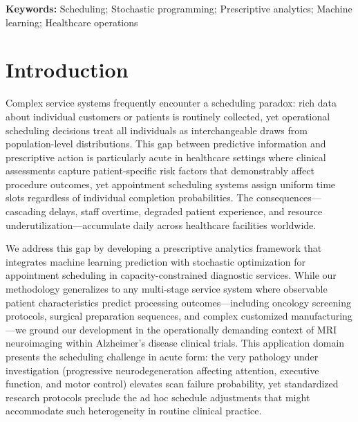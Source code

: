 \documentclass[11pt,a4paper]{article}
\begin{document}
\noindent\textbf{Keywords:} Scheduling; Stochastic programming; Prescriptive analytics; Machine learning; Healthcare operations



\newpage
\section{Introduction}


Complex service systems frequently encounter a scheduling paradox: rich data about individual customers or patients is routinely collected, yet operational scheduling decisions treat all individuals as interchangeable draws from population-level distributions. This gap between predictive information and prescriptive action is particularly acute in healthcare settings where clinical assessments capture patient-specific risk factors that demonstrably affect procedure outcomes, yet appointment scheduling systems assign uniform time slots regardless of individual completion probabilities. The consequences---cascading delays, staff overtime, degraded patient experience, and resource underutilization---accumulate daily across healthcare facilities worldwide.

We address this gap by developing a prescriptive analytics framework that integrates machine learning prediction with stochastic optimization for appointment scheduling in capacity-constrained diagnostic services. While our methodology generalizes to any multi-stage service system where observable patient characteristics predict processing outcomes---including oncology screening protocols, surgical preparation sequences, and complex customized manufacturing---we ground our development in the operationally demanding context of MRI neuroimaging within Alzheimer's disease clinical trials. This application domain presents the scheduling challenge in acute form: the very pathology under investigation (progressive neurodegeneration affecting attention, executive function, and motor control) elevates scan failure probability, yet standardized research protocols preclude the ad hoc schedule adjustments that might accommodate such heterogeneity in routine clinical practice.
\end{document}
